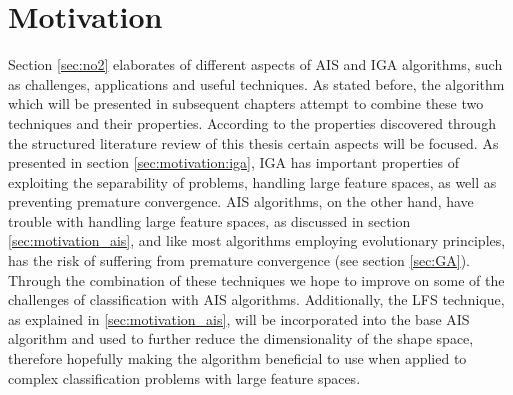 \section{Motivation}
Section \ref{sec:no2} elaborates of different aspects of AIS and IGA algorithms, such as challenges, applications and useful techniques. As stated before, the algorithm which will be presented in subsequent chapters attempt to combine these two techniques and their properties. According to the properties discovered through the structured literature review of this thesis certain aspects will be focused. As presented in section \ref{sec:motivation:iga}, IGA has important properties of exploiting the separability of problems, handling large feature spaces, as well as preventing premature convergence. AIS algorithms, on the other hand, have trouble with handling large feature spaces, as discussed in section \ref{sec:motivation_ais}, and like most algorithms employing evolutionary principles, has the risk of suffering from premature convergence (see section \ref{sec:GA}). Through the combination of these techniques we hope to improve on some of the challenges of classification with AIS algorithms. Additionally, the LFS technique, as explained in \ref{sec:motivation_ais}, will be incorporated into the base AIS algorithm and used to further reduce the dimensionality of the shape space, therefore hopefully making the algorithm beneficial to use when applied to complex classification problems with large feature spaces.  



